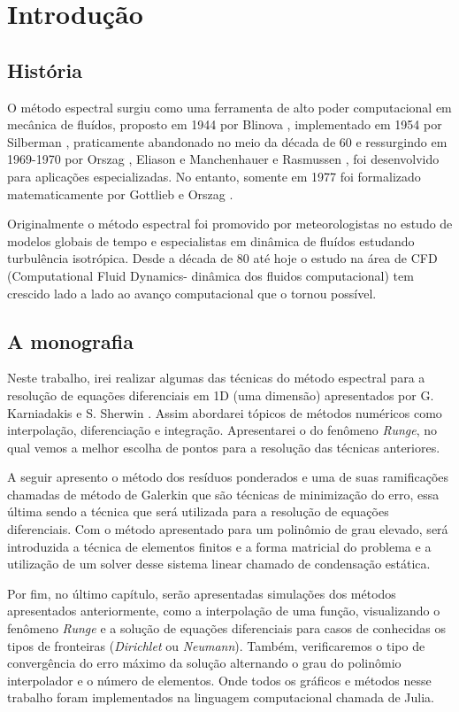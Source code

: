 \chapter{Introdução}
\label{cap:introducao}
\section{História}
O método espectral surgiu como uma ferramenta de alto poder computacional em mecânica de fluídos, proposto em 1944 por Blinova \cite{blinova1944}, implementado em 1954 por Silberman \cite{silberman}, praticamente abandonado no meio da década de 60 e ressurgindo em 1969-1970 por Orszag \cite{Orszag70}, Eliason e Manchenhauer  e Rasmussen \cite{eliasenauermussen}, foi desenvolvido para aplicações especializadas. No entanto,  somente em 1977 foi formalizado matematicamente por Gottlieb e Orszag \cite{Orslieb77}.

Originalmente o método espectral foi promovido por meteorologistas no estudo de modelos globais de tempo e especialistas em dinâmica de fluídos estudando turbulência isotrópica. Desde a década de 80 até hoje o  estudo na área de CFD (Computational Fluid Dynamics- dinâmica dos fluidos computacional) tem crescido lado a lado ao avanço computacional que o tornou possível.
\section{A monografia}
 Neste trabalho, irei realizar algumas das técnicas do método espectral para a resolução de equações diferenciais em 1D (uma dimensão) apresentados por G. Karniadakis e S. Sherwin \citep{book:karniadakis}. Assim abordarei tópicos de métodos numéricos como  interpolação, diferenciação e integração. Apresentarei o do fenômeno \emph{Runge}, no qual vemos a melhor escolha de pontos para a resolução das técnicas anteriores.
 
 A seguir apresento o  método dos resíduos ponderados e uma de suas ramificações chamadas de  método de Galerkin que são técnicas de minimização do erro, essa última sendo a técnica que será utilizada para a resolução de equações diferenciais. Com o método apresentado para um polinômio de grau elevado, será introduzida a técnica de elementos finitos e a forma matricial do problema e a utilização de um solver desse sistema linear chamado de condensação estática.
 
 Por fim, no último capítulo, serão apresentadas simulações dos métodos apresentados anteriormente, como a interpolação de uma função, visualizando o fenômeno \emph{Runge} e a solução de equações diferenciais para casos de conhecidas os tipos de fronteiras (\emph{Dirichlet} ou \emph{Neumann}). Também, verificaremos o tipo de convergência do erro máximo da solução alternando o grau do polinômio interpolador e o número de elementos. Onde todos os gráficos e métodos nesse trabalho foram implementados na linguagem computacional chamada de Julia.
  
